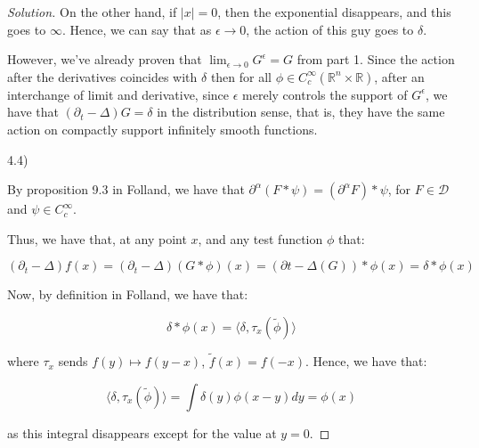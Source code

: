 \documentclass[10pt]{article}
\begin{document}
\begin{proof}[Solution]
On the other hand, if $|x| = 0$, then the exponential disappears, and this goes to $\infty$. Hence, we can say that as $\epsilon \to 0$, the action of this guy goes to $\delta$.

However, we've already proven that $\lim_{\epsilon \to 0} G^\epsilon = G$ from part 1. Since the action after the derivatives coincides with $\delta$ then for all $\phi \in C^\infty_c(\mathbb{R}^n \times \mathbb{R})$, after an interchange of limit and derivative, since $\epsilon$ merely controls the support of $G^\epsilon$, we have that $(\partial_t - \Delta) G = \delta$ in the distribution sense, that is, they have the same action on compactly support infinitely smooth functions.

4.4)

By proposition 9.3 in Folland, we have that $\partial^\alpha(F \ast \psi) = (\partial^\alpha F) \ast \psi$, for $F \in \mathcal{D}$ and $\psi \in C^\infty_c$.

Thus, we have that, at any point $x$, and any test function $\phi$ that:

$$ ( \partial_t - \Delta)f(x) = (\partial_t - \Delta)(G \ast \phi)(x) = (\partial t - \Delta (G)) \ast \phi(x) = \delta \ast \phi(x)$$

Now, by definition in Folland, we have that:

$$ \delta \ast \phi(x) = \langle \delta, \tau_x(\tilde{\phi}) \rangle$$

where $\tau_x$ sends $f(y) \mapsto f(y - x)$, $\tilde{f}(x) = f(-x)$. Hence, we have that:

$$ \langle \delta, \tau_x(\tilde{\phi}) \rangle = \int \delta(y) \phi(x - y) dy = \phi(x) $$

as this integral disappears except for the value at $y = 0$.

\end{proof}
\end{document}
